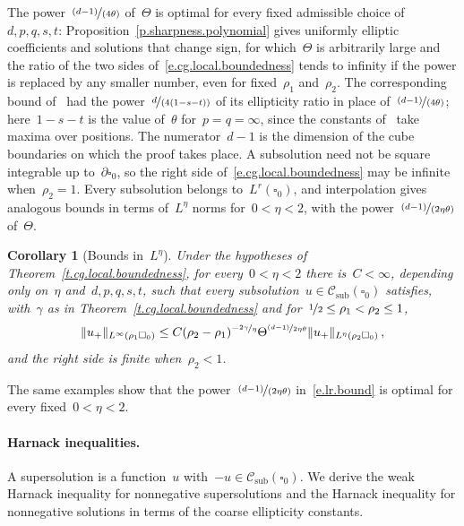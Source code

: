 \documentclass[11pt,letterpaper]{article}
\numberwithin{equation}{section}
\newtheorem{corollaryA}[theoremA]{Corollary}
\theoremstyle{definition}
\newcommand{\nf}{\nicefrac}
\newcommand{\cu}{\square}
\DeclarePairedDelimiter{\norm}{\lVert}{\rVert}
\newcommand{\Csub}{\mathcal C_{\mathrm{sub}}}
\begin{document}
The power~$\nf{(d-1)}{(4\theta)}$ of~$\Theta$ is optimal for every fixed admissible choice of~$d,p,q,s,t$: Proposition~\ref{p.sharpness.polynomial} gives uniformly elliptic coefficients and solutions that change sign, for which~$\Theta$ is arbitrarily large and the ratio of the two sides of~\eqref{e.cg.local.boundedness} tends to infinity if the power is replaced by any smaller number, even for fixed~$\rho_1$ and~$\rho_2$. The corresponding bound of~\cite{AADKM} had the power~$\nf d{(4(1-s-t))}$ of its ellipticity ratio in place of~$\nf{(d-1)}{(4\theta)}$; here~$1-s-t$ is the value of~$\theta$ for~$p=q=\infty$, since the constants of~\cite{AADKM} take maxima over positions. The numerator~$d-1$ is the dimension of the cube boundaries on which the proof takes place. A subsolution need not be square integrable up to~$\partial\cu_0$,
so the right side of~\eqref{e.cg.local.boundedness} may be
infinite when~$\rho_2=1$.
Every subsolution belongs to~$L^r(\cu_0)$, and interpolation
gives analogous bounds in terms of~$L^\eta$ norms for~$0<\eta<2$, with the power~$\nf{(d-1)}{(2\eta\theta)}$
of~$\Theta$.

\begin{corollaryA}[Bounds in~$L^\eta$]
\label{c.lr.bound}
Under the hypotheses of Theorem~\ref{t.cg.local.boundedness}, for every~$0<\eta<2$ there is~$C<\infty$, depending only on~$\eta$ and~$d,p,q,s,t$, such that every subsolution~$u\in\Csub(\cu_0)$ satisfies, with~$\gamma$ as in Theorem~\ref{t.cg.local.boundedness} and for~$\nf12\leq\rho_1<\rho_2\leq1$,
\begin{equation}
	\norm{u_+}_{L^\infty(\rho_1\cu_0)}\leq C(\rho_2-\rho_1)^{-\nf{2\gamma}\eta}\Theta^{\nf{(d-1)}{2\eta\theta}}\norm{u_+}_{L^\eta(\rho_2\cu_0)}\,,
	\label{e.lr.bound}
\end{equation}
and the right side is finite when~$\rho_2<1$.
\end{corollaryA}

The same examples show that the power~$\nf{(d-1)}{(2\eta\theta)}$ in~\eqref{e.lr.bound} is optimal for every fixed~$0<\eta<2$.

\paragraph{Harnack inequalities.} A supersolution is a function~$u$ with~$-u\in\Csub(\cu_0)$. We derive the weak Harnack inequality for nonnegative supersolutions
and the Harnack inequality for nonnegative solutions in terms of
the coarse ellipticity constants.
\end{document}
